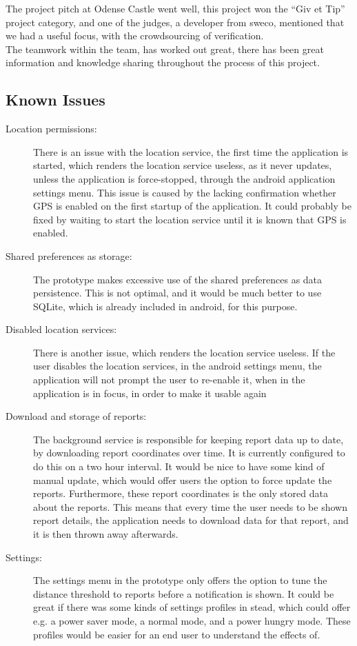 The project pitch at Odense Castle went well, this project won the “Giv et Tip” project category, and one of the judges, a developer from sweco, mentioned that we had a useful focus, with the crowdsourcing of verification.
~\\
The teamwork within the team, has worked out great, there has been great information and knowledge sharing throughout the process of this project.

\subsection{Known Issues}

\begin{description}
\item [Location permissions:] There is an issue with the location service, the first time the application is started, which renders the location service useless, as it never updates, unless the application is force-stopped, through the android application settings menu. This issue is caused by the lacking confirmation whether GPS is enabled on the first startup of the application. It could probably be fixed by waiting to start the location service until it is known that GPS is enabled.
\item [Shared preferences as storage:] The prototype makes excessive use of the shared preferences as data persistence. This is not optimal, and it would be much better to use SQLite, which is already included in android, for this purpose.
\item [Disabled location services:] There is another issue, which renders the location service useless. If the user disables the location services, in the android settings menu, the application will not prompt the user to re-enable it, when in the application is in focus, in order to make it usable again
\item [Download and storage of reports:] The background service is responsible for keeping report data up to date, by downloading report coordinates over time. It is currently configured to do this on a two hour interval. It would be nice to have some kind of manual update, which would offer users the option to force update the reports. Furthermore, these report coordinates is the only stored data about the reports. This means that every time the user needs to be shown report details, the application needs to download data for that report, and it is then thrown away afterwards.
\item [Settings:] The settings menu in the prototype only offers the option to tune the distance threshold to reports before a notification is shown. It could be great if there was some kinds of settings profiles in stead, which could offer e.g. a power saver mode, a  normal mode, and a power hungry mode. These profiles would be easier for an end user to understand the effects of.

\end{description}

